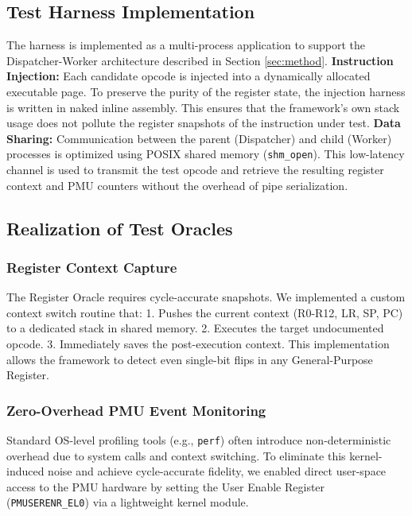 \documentclass[pdflatex,sn-mathphys]{sn-jnl}%
\theoremstyle{thmstyleone}%
\theoremstyle{thmstyletwo}%
\theoremstyle{thmstylethree}%
\begin{document}
\subsection{Test Harness Implementation}
The harness is implemented as a multi-process application to support the Dispatcher-Worker architecture described in Section \ref{sec:method}.
\textbf{Instruction Injection:} Each candidate opcode is injected into a dynamically allocated executable page. To preserve the purity of the register state, the injection harness is written in naked inline assembly. This ensures that the framework's own stack usage does not pollute the register snapshots of the instruction under test.
\textbf{Data Sharing:} Communication between the parent (Dispatcher) and child (Worker) processes is optimized using POSIX shared memory (\texttt{shm\_open}). This low-latency channel is used to transmit the test opcode and retrieve the resulting register context and PMU counters without the overhead of pipe serialization.

\subsection{Realization of Test Oracles}

\subsubsection{Register Context Capture}
The Register Oracle requires cycle-accurate snapshots. We implemented a custom context switch routine that:
1. Pushes the current context (R0-R12, LR, SP, PC) to a dedicated stack in shared memory.
2. Executes the target undocumented opcode.
3. Immediately saves the post-execution context.
This implementation allows the framework to detect even single-bit flips in any General-Purpose Register.


\subsubsection{Zero-Overhead PMU Event Monitoring}
Standard OS-level profiling tools (e.g., \texttt{perf}) often introduce non-deterministic overhead due to system calls and context switching. To eliminate this kernel-induced noise and achieve cycle-accurate fidelity, we enabled direct user-space access to the PMU hardware by setting the User Enable Register (\texttt{PMUSERENR\_EL0}) via a lightweight kernel module.
\end{document}
